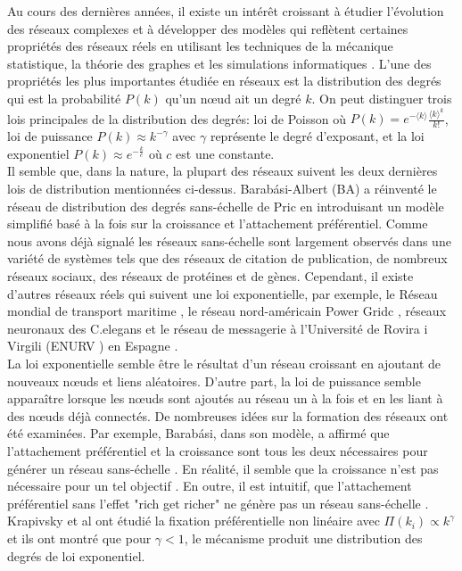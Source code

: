 Au cours des dernières années, il existe un intérêt croissant à étudier l'évolution des réseaux complexes et à développer des modèles qui reflètent certaines propriétés des réseaux réels en utilisant les techniques de la mécanique statistique, la théorie des graphes et les simulations informatiques \cite{BA1999,AB2002,Dorogovtsev-Mendes2002,Newman2003}. L'une des propriétés les plus importantes étudiée en réseaux est la distribution des degrés qui est la probabilité $P(k)$ qu'un nœud ait un degré $k$.
On peut distinguer trois lois principales de la distribution des degrés: loi de Poisson où $P(k)=e^{-\langle k\rangle}\frac{\langle k\rangle^k}{k!}$, loi de puissance $P(k)\approx k^{-\gamma}$ avec $\gamma$ représente le degré d'exposant, et la loi exponentiel $P(k)\approx e^{-\frac{k}{c}}$ où $c$ est une constante.\\
Il semble que, dans la nature, la plupart des réseaux suivent les deux dernières lois de distribution mentionnées ci-dessus. Barab\'{a}si-Albert (BA) a réinventé le réseau de distribution des degrés sans-échelle de Pric en introduisant un modèle simplifié basé à la fois sur la croissance et l'attachement préférentiel. Comme nous avons déjà signalé les réseaux sans-échelle sont largement observés dans une variété de systèmes tels que des réseaux de citation de publication, de nombreux réseaux sociaux, des réseaux de protéines et de gènes. Cependant, il existe d'autres réseaux réels qui suivent une loi exponentielle, par exemple, le Réseau mondial de transport maritime \cite{ Deng-al2009}, le réseau nord-américain Power Gridc \cite{Albert-al2004}, réseaux neuronaux des C.elegans \cite{Achacoso-Yamamoto1992} et le réseau de messagerie à l'Université de Rovira i Virgili (ENURV ) en Espagne \cite{Albert-al2004}.\\
La loi exponentielle semble être le résultat d'un réseau croissant en ajoutant de nouveaux nœuds et liens aléatoires. D'autre part, la loi de puissance semble apparaître lorsque les nœuds sont ajoutés au réseau un à la fois et en les liant à des nœuds déjà connectés.
De nombreuses idées sur la formation des réseaux ont été examinées. Par exemple, Barab\'{a}si, dans son modèle, a affirmé que l'attachement préférentiel et la croissance sont tous les deux nécessaires pour générer un réseau sans-échelle \cite{BA-al1999}. En réalité, il semble que la croissance n'est pas nécessaire pour un tel objectif \cite{Xie-al2008}. En outre, il est intuitif, que l'attachement préférentiel sans l'effet "rich get richer" ne génère pas un réseau sans-échelle \cite{Samalam}. Krapivsky et al \cite{Krapivsky-al2000} ont étudié la fixation préférentielle non linéaire avec $\Pi(k_i)\varpropto k^{\gamma}$ et ils ont montré que pour $\gamma<1$, le mécanisme produit une distribution des degrés de loi exponentiel.

